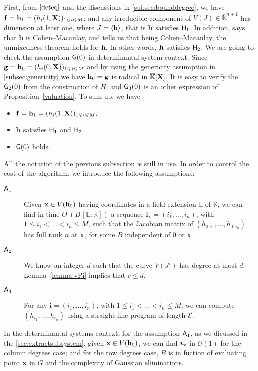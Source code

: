 \documentclass[11pt]{article}
\numberwithin{Property}{section}
\numberwithin{Theorem}{section}
\numberwithin{Proposition}{section}
\numberwithin{Lemma}{section}
\numberwithin{Corollary}{section}
\numberwithin{Definition}{section}
\numberwithin{Remark}{section}
\numberwithin{Conjecture}{section}
\numberwithin{Problem}{section}
\numberwithin{Claim}{section}
\theoremstyle{definition}
\numberwithin{Example}{section}
\def\h {\ensuremath{\mathbf{h}}}
\def\g {\ensuremath{\mathbf{g}}}
\renewcommand{\leq}{\leqslant}
\renewcommand{\le}{\leqslant}
\def\bar{\overline}
\newcommand{\bigO}[1]{\mathcal{O}(#1)} %
\renewcommand{\le}{\leqslant} %
\newcommand{\field}{\mathbb{K}} %
\newcommand{\mat}[1]{\mathbf{\MakeUppercase{#1}}} %
\newcommand{\improve}[1]{\textcolor{blue}{#1}} %
\begin{document}
First, from $\cref{deteq}$ and the discussions in \improve{\cref{subsec:bounddegree}}, we have ${\bf{f}} = {\bf{h}}_1 = (h_i(1,\mat{X}))_{1 \leq i \leq M}$; and any irreducible component of $V(J) \in \bar{\field}^{n+1}$ has dimension at least one, where $J = \langle {\bf h} \rangle$, that is $\bf{h}$ satisfies $\sf{H}_1$. In addition, \cite[~Corollary 16.44]{Miller04} says that $\h$ is Cohen--Macaulay, and \cite[~Theorem 17.6]{Matsumura86} tells us that being Cohen--Macaulay, the unmixedness theorem holds for $\h$. In other words, $\bf{h}$ satisfies $\sf{H}_2$. We are going to check the assumption ${\sf G}(0)$ in determinantal system context. Since $\g = {\bf{h}}_0 = (h_i(0,\mat{X}))_{1 \leq i \leq M}$ and by using the genericity assumption in \improve{\cref{subsec:genericity}} we have ${\bf{h}}_0 = \g$ is radical in $\bar{\field}[\mat{X}]$. It is easy to verify the ${\sf G}_2(0)$ from the construction of $H$; and ${\sf G}_3(0)$ is an other expression of Proposition~\ref{valuation}. To sum up, we have
\begin{itemize}
\item ${\bf{f}} = {\bf{h}}_1 = (h_i(1,\mat{X}))_{1 \leq i \leq M}$. 
\item $\bf{h}$ satisfies $\sf{H}_1$ and $\sf{H}_2$.
\item ${\sf G}(0)$ holds.
\end{itemize}
All the notation of the previous subsection is still in use. In order to control the cost of the algorithm, we introduce the following assumptions:
\begin{description}
\item[${\sf A}_1$] Given ${\bf x} \in V(\h_0)$ having coordinates in a field extension $\mathbb{L}$ of $\field$, we can find in time $O\tilde{~}(B\, [\mathbb{L} : \field])$ a sequence ${\bm i}_{\mathbf{x}}= (i_1,\dots,i_n)$, with $1 \le i_1 < \dots < i_n \le M$, such that the Jacobian matrix of $(h_{0,i_1},\dots,h_{0,{i_n}})$ has full rank $n$ at ${\bf x}$, for some $B$ independent of $0$ or ${\bf x}$.
\item[${\sf A}_2$] We know an integer $d$ such that the curve $V(J')$ has degree at most $d$. Lemma~\ref{lemma:vPi} implies that  $c \le d$.
\item[${\sf A}_3$] For any ${\bm i}=(i_1,\dots,i_n)$, with $1 \le i_1 <
  \dots < i_n \le M$, we can compute $(h_{i_1},\dots,h_{{i_n}})$ using
  a straight-line program of length $\mathcal{E}$.
\end{description}

In the determinantal systems context, for the assumption ${\sf A}_1$, as we dicussed in the \improve{\cref{sec:extractsubsystem}}, given ${\bf x} \in V(\h_0)$, we can find ${\bm i}_{\bf x}$ in $\bigO{1}$ for the column degrees case; and for the row degrees case, $B$ is in fuction of evaluating point ${\bf x}$ in $\bar{G}$ and the complexity of Gaussian eliminations.  
\end{document}
